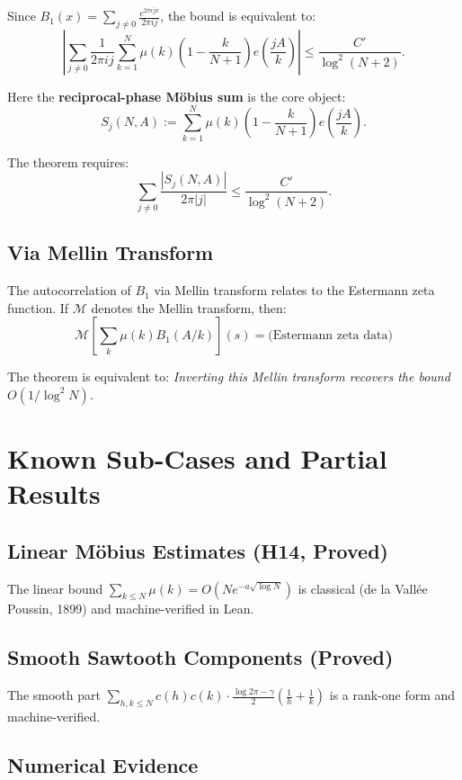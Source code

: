 \documentclass[11pt,a4paper]{article}
\begin{document}
Since $B_1(x) = \sum_{j \ne 0} \frac{e^{2\pi i jx}}{2\pi i j}$, the bound is equivalent to:
\[
\left| \sum_{j \ne 0} \frac{1}{2\pi i j} \sum_{k=1}^{N} \mu(k) \left(1 - \frac{k}{N+1}\right) e\left(\frac{jA}{k}\right) \right| \le \frac{C'}{\log^2(N+2)}.
\]

Here the \textbf{reciprocal-phase Möbius sum} is the core object:
\[
S_j(N, A) := \sum_{k=1}^{N} \mu(k) \left(1 - \frac{k}{N+1}\right) e\left(\frac{jA}{k}\right).
\]

The theorem requires:
\[
\sum_{j \ne 0} \frac{|S_j(N, A)|}{2\pi|j|} \le \frac{C'}{\log^2(N+2)}.
\]

\subsection{Via Mellin Transform}

The autocorrelation of $B_1$ via Mellin transform relates to the Estermann zeta function. If $\mathcal{M}$ denotes the Mellin transform, then:
\[
\mathcal{M}\left[\sum_{k} \mu(k) B_1(A/k)\right](s) = \text{(Estermann zeta data)}
\]

The theorem is equivalent to: \emph{Inverting this Mellin transform recovers the bound $O(1/\log^2 N)$.}

\section{Known Sub-Cases and Partial Results}

\subsection{Linear Möbius Estimates (H14, Proved)}

The linear bound $\sum_{k \le N} \mu(k) = O(N e^{-a\sqrt{\log N}})$ is classical (de la Vallée Poussin, 1899) and machine-verified in Lean.

\subsection{Smooth Sawtooth Components (Proved)}

The smooth part $\sum_{h,k \le N} c(h) c(k) \cdot \frac{\log 2\pi - \gamma}{2}\left(\frac{1}{h} + \frac{1}{k}\right)$ is a rank-one form and machine-verified.

\subsection{Numerical Evidence}
\end{document}
